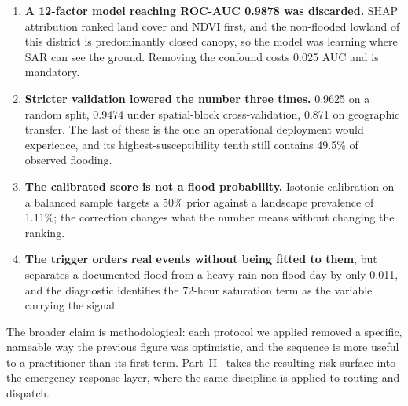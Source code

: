\documentclass[journal]{IEEEtran}
\begin{document}
\begin{enumerate}
\item \textbf{A 12-factor model reaching ROC-AUC 0.9878 was discarded.} SHAP
      attribution ranked land cover and NDVI first, and the non-flooded lowland
      of this district is predominantly closed canopy, so the model was learning
      where SAR can see the ground. Removing the confound costs 0.025 AUC and is
      mandatory.
\item \textbf{Stricter validation lowered the number three times.} 0.9625 on a
      random split, 0.9474 under spatial-block cross-validation, 0.871 on
      geographic transfer. The last of these is the one an operational
      deployment would experience, and its highest-susceptibility tenth still
      contains 49.5\% of observed flooding.
\item \textbf{The calibrated score is not a flood probability.} Isotonic
      calibration on a balanced sample targets a 50\% prior against a landscape
      prevalence of 1.11\%; the correction changes what the number means without
      changing the ranking.
\item \textbf{The trigger orders real events without being fitted to them},
      but separates a documented flood from a heavy-rain non-flood day by only
      0.011, and the diagnostic identifies the 72-hour saturation term as the
      variable carrying the signal.
\end{enumerate}

The broader claim is methodological: each protocol we applied removed a specific,
nameable way the previous figure was optimistic, and the sequence is more useful
to a practitioner than its first term. Part~II~\cite{partii} takes the resulting
risk surface into the emergency-response layer, where the same discipline is
applied to routing and dispatch.
\end{document}
